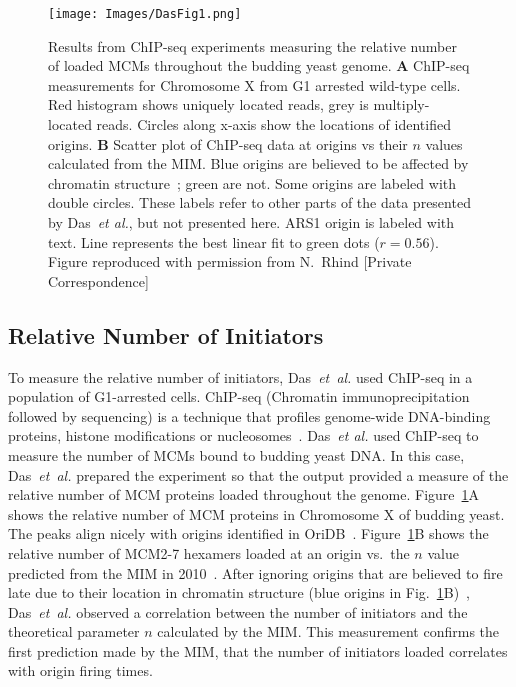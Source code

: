 {		\begin{figure}[tbh!]
			\begin{center}
				\texttt{[image: Images/DasFig1.png]}
			\end{center}
				\caption[Relative amounts of loaded MCM]{\label{fig:Das1} Results from ChIP-seq experiments measuring the relative number of loaded MCMs throughout the budding yeast genome.
					\textbf{A} ChIP-seq measurements for Chromosome X from G1 arrested wild-type cells.
					Red histogram shows uniquely located reads, grey is multiply-located reads.
					Circles along x-axis show the locations of identified origins.
					\textbf{B} Scatter plot of ChIP-seq data at origins vs their $n$ values calculated from the MIM.
					Blue origins are believed to be affected by chromatin structure~\cite{Chromatin}; green are not.
					Some origins are labeled with double circles.
					These labels refer to other parts of the data presented by Das~\emph{et al.}, but not presented here.
					ARS1 origin is labeled with text.
					Line represents the best linear fit to green dots ($r=0.56$).
					Figure reproduced with permission from N.~Rhind [Private Correspondence]~\cite{Rhind}}
		\end{figure}
	
		\subsection{Relative Number of Initiators}
		\label{subsec:RelativeNo}
		
		To measure the relative number of initiators, Das~\emph{et~al.} used ChIP-seq in a population of G1-arrested cells.
		ChIP-seq (Chromatin immunoprecipitation followed by sequencing) is a technique that profiles genome-wide DNA-binding proteins, histone modifications or nucleosomes~\cite{ChIP-seq}.
		Das~\emph{et al.} used ChIP-seq to measure the number of MCMs bound to budding yeast DNA.
		In this case, Das~\emph{et~al.} prepared the experiment so that the output provided a measure of the relative number of MCM proteins loaded throughout the genome.
		Figure~\ref{fig:Das1}A shows the relative number of MCM proteins in Chromosome X of budding yeast.
		The peaks align nicely with origins identified in OriDB~\cite{OriDB}.
		Figure~\ref{fig:Das1}B shows the relative number of MCM2-7 hexamers loaded at an origin vs.\ the $n$ value predicted from the MIM in 2010~\cite{ScottsPaper}.
		After ignoring origins that are believed to fire late due to their location in chromatin structure (blue origins in Fig.~\ref{fig:Das1}B)~\cite{Chromatin}, Das~\emph{et~al.} observed a correlation between the number of initiators and the theoretical parameter $n$ calculated by the MIM.
		This measurement confirms the first prediction made by the MIM, that the number of initiators loaded correlates with origin firing times.
		
}
